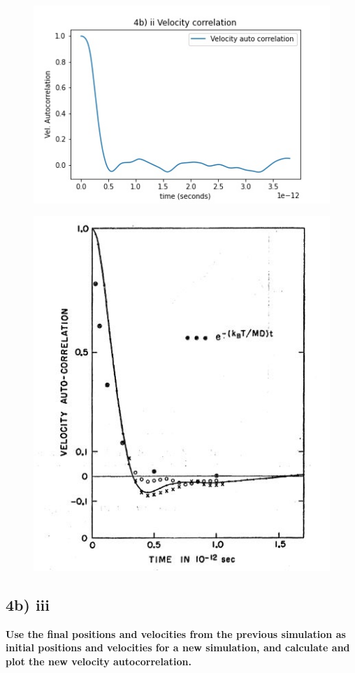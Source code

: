 \documentclass[a4paper,10pt,english]{article}
\begin{document}
\begin{figure}
\centering
\begin{minipage}{.5\textwidth}
  \centering
  \includegraphics[width=.7\linewidth]{./py/img/4b_ii_velcorr.jpg} 
  \label{fig:test1}
\end{minipage}%
\begin{minipage}{.5\textwidth}
  \centering
  \includegraphics[width=.7\linewidth]{./py/img/4Rahman.jpg} 
  \label{fig:test2}
\end{minipage}
\end{figure}

\newpage
\subsection*{4b) iii}
\textbf{Use the final positions and velocities from the previous simulation as initial positions and
velocities for a new simulation, and calculate and plot the new velocity autocorrelation.}
\end{document}
